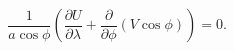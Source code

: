 \begin{equation}
    \frac{1}{a\cos\phi}\left(\frac{\partial U}{\partial\lambda} + \frac{\partial}{\partial\phi}\left(V\cos\phi\right)\right)=0.
\label{EQN:VIntContinuity}
\end{equation}
